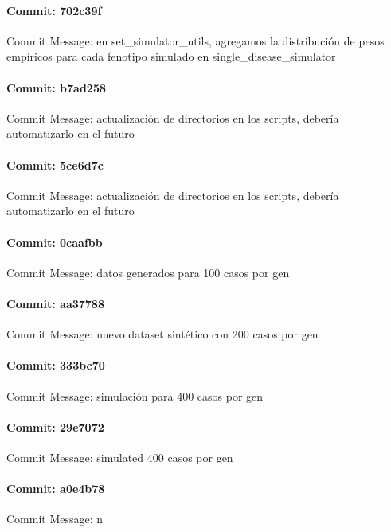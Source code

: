 \documentclass{article}
\begin{document}
\paragraph{Commit: 702c39f}
Commit Message: en set_simulator_utils, agregamos la distribución de pesos empíricos para cada fenotipo simulado en single_disease_simulator

\paragraph{Commit: b7ad258}
Commit Message: actualización de directorios en los scripts, debería automatizarlo en el futuro

\paragraph{Commit: 5ce6d7c}
Commit Message: actualización de directorios en los scripts, debería automatizarlo en el futuro

\paragraph{Commit: 0caafbb}
Commit Message: datos generados para 100 casos por gen

\paragraph{Commit: aa37788}
Commit Message: nuevo dataset sintético con 200 casos por gen

\paragraph{Commit: 333bc70}
Commit Message: simulación para 400 casos por gen

\paragraph{Commit: 29e7072}
Commit Message: simulated 400 casos por gen

\paragraph{Commit: a0e4b78}
Commit Message: n

\end{document}
